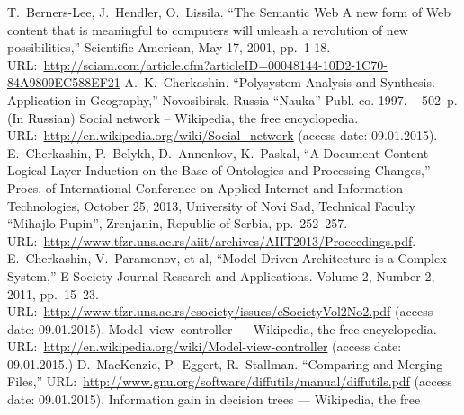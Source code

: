 \documentclass[conference]{IEEEtran}
\begin{document}
%
%
%
\vspace{1.4em} %
\begin{thebibliography}{11}
 T.~Berners-Lee, J.~Hendler, O.~Lissila. ``The
  Semantic Web A new form of Web content that is meaningful to
  computers will unleash a revolution of new possibilities,''
  Scientific American, May 17, 2001,
  pp.~1-18. URL:~\url{http://sciam.com/article.cfm?articleID=00048144-10D2-1C70-84A9809EC588EF21}
 A.~K.~Cherkashin. ``Polysystem Analysis and
  Synthesis. Application in Geography,'' Novosibirsk, Russia ``Nauka'' Publ. co.
  1997. -- 502~p. (In Russian)
 Social network -- Wikipedia, the free encyclopedia.
  URL:~\url{http://en.wikipedia.org/wiki/Social_network} (access date: 09.01.2015).
 E.~Cherkashin, P.~Belykh, D.~Annenkov, K.~Paskal, ``A
  Document Content Logical Layer Induction on the Base of Ontologies
  and Processing Changes,'' Procs. of International Conference on
  Applied Internet and Information Technologies, October 25, 2013,
  University of Novi Sad, Technical Faculty ``Mihajlo Pupin'',
  Zrenjanin, Republic of Serbia,
  pp.~252--257. URL:~\url{http://www.tfzr.uns.ac.rs/aiit/archives/AIIT2013/Proceedings.pdf}.
 E.~Cherkashin, V.~Paramonov, et al, ``Model Driven
  Architecture is a Complex System,'' E-Society Journal Research and
  Applications. Volume 2, Number 2, 2011, pp.~15--23.
  URL:~\url{http://www.tfzr.uns.ac.rs/esociety/issues/eSocietyVol2No2.pdf} (access date: 09.01.2015).
 Model--view--controller --- Wikipedia, the free
  encyclopedia.
  URL:~\url{http://en.wikipedia.org/wiki/Model-view-controller} (access date: 09.01.2015.)
 D.~MacKenzie, P.~Eggert, R.~Stallman. ``Comparing and Merging Files,''
  URL:~\url{http://www.gnu.org/software/diffutils/manual/diffutils.pdf} (access date: 09.01.2015).
 Information gain in decision trees ---  Wikipedia, the free

\end{thebibliography}
\end{document}
